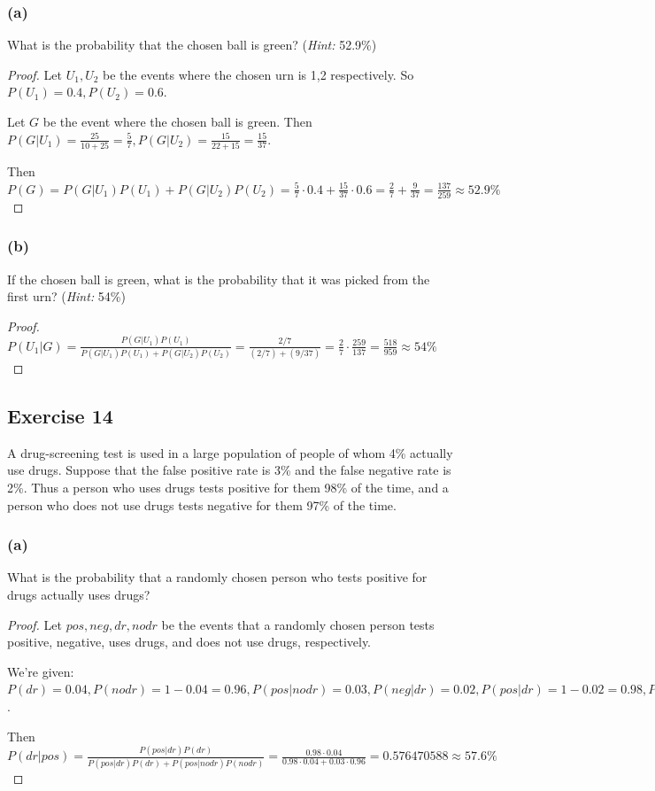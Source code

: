 \documentclass[14pt]{extarticle}
\begin{document}
\subsubsection{(a)}
What is the probability that the chosen ball is green? ({\it Hint:} 52.9\%)

\begin{proof}
Let \(U_1, U_2\) be the events where the chosen urn is 1,2 respectively. So \(P(U_1) = 0.4, P(U_2) = 0.6 \). 

Let \(G\) be the event where the chosen ball is green. Then \(P(G|U_1) = \frac{25}{10+25} = \frac{5}{7}, P(G|U_2) = 
\frac{15}{22+15} = \frac{15}{37}\). 

Then \(P(G) = P(G|U_1)P(U_1) + P(G|U_2)P(U_2) = \frac{5}{7} \cdot 0.4 + \frac{15}{37} \cdot 0.6 = \frac{2}{7} + \frac{9}
{37} = \frac{137}{259} \approx 52.9\%\)
\end{proof}

\subsubsection{(b)}
If the chosen ball is green, what is the probability that it was picked from the first urn? ({\it Hint:} 54\%)

\begin{proof}
\(P(U_1|G) = \frac{P(G|U_1)P(U_1)}{P(G|U_1)P(U_1) + P(G|U_2)P(U_2)} = \frac{2/7}{(2/7) + (9/37)} = \frac{2}{7} \cdot
\frac{259}{137} = \frac{518}{959} \approx 54\%\)
\end{proof}

\subsection{Exercise 14}
A drug-screening test is used in a large population of people of whom 4\% actually use drugs. Suppose that the false 
positive rate is 3\% and the false negative rate is 2\%. Thus a person who uses drugs tests positive for them 98\% of the 
time, and a person who does not use drugs tests negative for
them 97\% of the time.

\subsubsection{(a)}
What is the probability that a randomly chosen person who tests positive for drugs actually uses drugs?

\begin{proof}
Let \(pos, neg, dr, nodr\) be the events that a randomly chosen person tests positive, negative, uses drugs, and does 
not use drugs, respectively.

We're given: \(P(dr) = 0.04, P(nodr) = 1 - 0.04 = 0.96, P(pos|nodr) = 0.03, P(neg|dr) = 0.02, P(pos|dr) = 1 - 0.02 = 
0.98, P(neg|nodr) = 1 - 0.03 = 0.97\).

Then \(P(dr|pos) = \frac{P(pos|dr)P(dr)}{P(pos|dr)P(dr) + P(pos|nodr)P(nodr)} = \frac{0.98 \cdot 0.04}{0.98 \cdot 0.04
+ 0.03 \cdot 0.96} = 0.576470588 \approx 57.6\%\)
\end{proof}
\end{document}
